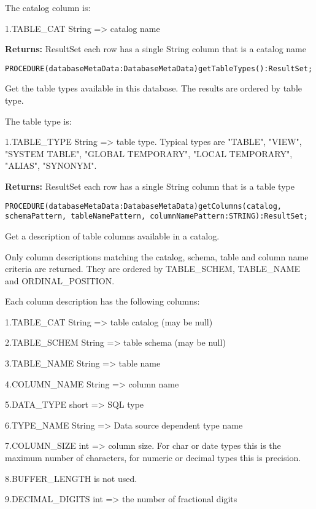 The catalog column is: 

1.TABLE\_CAT String => catalog name 


{\bf Returns: } 
ResultSet each row has a single String column that is a catalog name 




\verb'PROCEDURE(databaseMetaData:DatabaseMetaData)getTableTypes():ResultSet;'






Get the table types available in this database. The results are ordered by table type. 

The table type is: 

1.TABLE\_TYPE String => table type. Typical types are "TABLE", "VIEW", "SYSTEM TABLE", "GLOBAL TEMPORARY", "LOCAL TEMPORARY", "ALIAS", "SYNONYM". 


{\bf Returns: } 
ResultSet each row has a single String column that is a table type 




\verb'PROCEDURE(databaseMetaData:DatabaseMetaData)getColumns(catalog, schemaPattern, tableNamePattern, columnNamePattern:STRING):ResultSet;'





Get a description of table columns available in a catalog. 

Only column descriptions matching the catalog, schema, table and column name criteria are returned. They are ordered by TABLE\_SCHEM, TABLE\_NAME and ORDINAL\_POSITION. 

Each column description has the following columns: 

1.TABLE\_CAT String => table catalog (may be null)

2.TABLE\_SCHEM String => table schema (may be null)

3.TABLE\_NAME String => table name

4.COLUMN\_NAME String => column name

5.DATA\_TYPE short => SQL type 

6.TYPE\_NAME String => Data source dependent type name

7.COLUMN\_SIZE int => column size. For char or date types this is the maximum number of characters, for numeric or decimal types this is precision. 

8.BUFFER\_LENGTH is not used. 

9.DECIMAL\_DIGITS int => the number of fractional digits 

